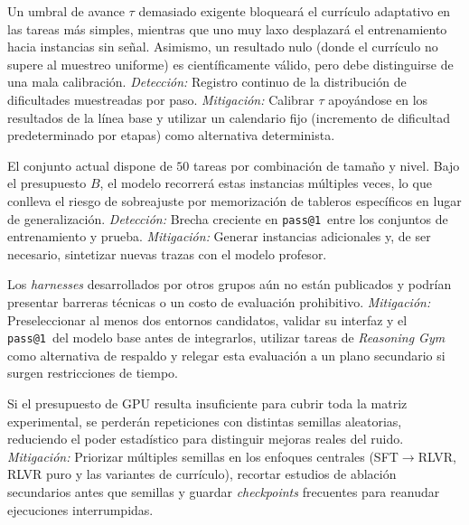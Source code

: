 \documentclass[letterpaper,11pt]{article}
\makeatletter
\newcommand{\passuno}{\texttt{pass@1}}
\makeatother
\begin{document}
\begin{description}[leftmargin=0pt]
  \item[Estancamiento o ineficacia del currículo.] Un umbral de avance $\tau$ demasiado exigente bloqueará el currículo adaptativo en las tareas más simples, mientras que uno muy laxo desplazará el entrenamiento hacia instancias sin señal. Asimismo, un resultado nulo (donde el currículo no supere al muestreo uniforme) es científicamente válido, pero debe distinguirse de una mala calibración. \emph{Detección:} Registro continuo de la distribución de dificultades muestreadas por paso. \emph{Mitigación:} Calibrar $\tau$ apoyándose en los resultados de la línea base y utilizar un calendario fijo (incremento de dificultad predeterminado por etapas) como alternativa determinista.

  \item[Escasez de instancias de entrenamiento.] El conjunto actual dispone de $50$ tareas por combinación de tamaño y nivel. Bajo el presupuesto $B$, el modelo recorrerá estas instancias múltiples veces, lo que conlleva el riesgo de sobreajuste por memorización de tableros específicos en lugar de generalización. \emph{Detección:} Brecha creciente en \passuno\ entre los conjuntos de entrenamiento y prueba. \emph{Mitigación:} Generar instancias adicionales y, de ser necesario, sintetizar nuevas trazas con el modelo profesor.

  \item[Indisponibilidad o incompatibilidad de entornos externos.] Los \emph{harnesses} desarrollados por otros grupos aún no están publicados y podrían presentar barreras técnicas o un costo de evaluación prohibitivo. \emph{Mitigación:} Preseleccionar al menos dos entornos candidatos, validar su interfaz y el \passuno\ del modelo base antes de integrarlos, utilizar tareas de \emph{Reasoning Gym} como alternativa de respaldo y relegar esta evaluación a un plano secundario si surgen restricciones de tiempo.

  \item[Insuficiencia de cómputo.] Si el presupuesto de GPU resulta insuficiente para cubrir toda la matriz experimental, se perderán repeticiones con distintas semillas aleatorias, reduciendo el poder estadístico para distinguir mejoras reales del ruido. \emph{Mitigación:} Priorizar múltiples semillas en los enfoques centrales (SFT$\to$RLVR, RLVR puro y las variantes de currículo), recortar estudios de ablación secundarios antes que semillas y guardar \emph{checkpoints} frecuentes para reanudar ejecuciones interrumpidas.
\end{description}
\end{document}
